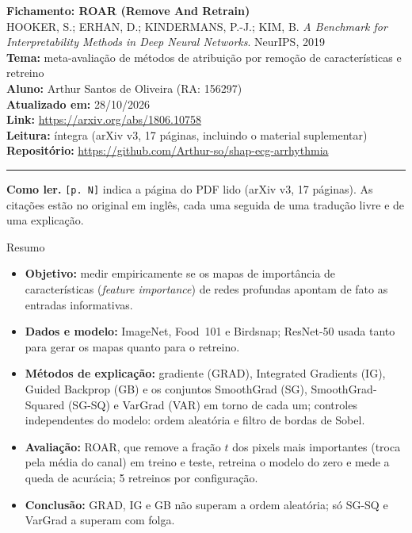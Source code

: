 \documentclass[11pt,a4paper]{article}
\begin{document}
\begin{center}
    {\LARGE \textbf{Fichamento: ROAR (Remove And Retrain)}} \\[0.35em]
    {\large HOOKER, S.; ERHAN, D.; KINDERMANS, P.-J.; KIM, B. \textit{A Benchmark for Interpretability Methods in Deep Neural Networks}. NeurIPS, 2019} \\[0.3em]
    \textbf{Tema:} meta-avaliação de métodos de atribuição por remoção de características e retreino \\[0.2em]
    \textbf{Aluno:} Arthur Santos de Oliveira (RA: 156297) \\[0.2em]
    \textbf{Atualizado em:} 28/10/2026 \\[0.2em]
    \textbf{Link:} \url{https://arxiv.org/abs/1806.10758} \\[0.2em]
    \textbf{Leitura:} íntegra (arXiv v3, 17 páginas, incluindo o material suplementar) \\[0.2em]
    \textbf{Repositório:} \url{https://github.com/Arthur-so/shap-ecg-arrhythmia}
\end{center}
\vspace{-0.5em}
\hrule
\vspace{0.8em}

\textbf{Como ler.} \texttt{[p. N]} indica a página do PDF lido (arXiv v3, 17 páginas). As citações estão no original em inglês, cada uma seguida de uma tradução livre e de uma explicação.

\begin{infobox}[note]{Resumo}
\begin{itemize}
  \item \textbf{Objetivo:} medir empiricamente se os mapas de importância de características (\textit{feature importance}) de redes profundas apontam de fato as entradas informativas.
  \item \textbf{Dados e modelo:} ImageNet, Food~101 e Birdsnap; ResNet-50 usada tanto para gerar os mapas quanto para o retreino.
  \item \textbf{Métodos de explicação:} gradiente (GRAD), Integrated Gradients (IG), Guided Backprop (GB) e os conjuntos SmoothGrad (SG), SmoothGrad-Squared (SG-SQ) e VarGrad (VAR) em torno de cada um; controles independentes do modelo: ordem aleatória e filtro de bordas de Sobel.
  \item \textbf{Avaliação:} ROAR, que remove a fração $t$ dos pixels mais importantes (troca pela média do canal) em treino e teste, retreina o modelo do zero e mede a queda de acurácia; 5 retreinos por configuração.
  \item \textbf{Conclusão:} GRAD, IG e GB não superam a ordem aleatória; só SG-SQ e VarGrad a superam com folga.
\end{itemize}
\end{infobox}
\end{document}
